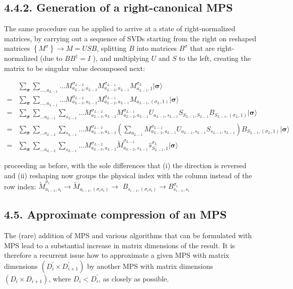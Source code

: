 \documentclass[12pt]{article}
\begin{document}
\subsection*{4.4.2. Generation of a right-canonical MPS}
The same procedure can be applied to arrive at a state of right-normalized matrices, by carrying out a sequence of SVDs starting from the right on reshaped matrices $\left\{M^{\sigma}\right\} \rightarrow M=U S B$, splitting $B$ into matrices $B^{\sigma}$ that are right-normalized (due to $B B^{\dagger}=I$ ), and multiplying $U$ and $S$ to the left, creating the matrix to be singular value decomposed next:


\begin{align*}
& \sum_{\boldsymbol{\sigma}} \sum_{\ldots, a_{L-1}} \ldots M_{a_{L-3}, a_{L-2}}^{\sigma_{L-2}} M_{a_{L-2}, a_{L-1}}^{\sigma_{L-1}} M_{a_{L-1}, 1}^{\sigma_{L}}|\boldsymbol{\sigma}\rangle \\
= & \sum_{\boldsymbol{\sigma}} \sum_{\ldots, a_{L-1}} \ldots M_{a_{L-3}, a_{L-2}}^{\sigma_{L-2}} M_{a_{L-2}, a_{L-1}}^{\sigma_{L-1}} M_{a_{L-1},\left(\sigma_{L}, 1\right)}|\boldsymbol{\sigma}\rangle \\
= & \sum_{\boldsymbol{\sigma}} \sum_{\ldots a_{L-1}} \sum_{s_{L-1}} \ldots M_{a_{L-3}, a_{L-2}}^{\sigma_{L-2}} M_{a_{L-2}, a_{L-1}}^{\sigma_{L-1}} U_{a_{L-1}, s_{L-1}} S_{S_{L-1}, S_{L-1}} B_{S_{L-1},\left(\sigma_{L}, 1\right)}|\boldsymbol{\sigma}\rangle \\
= & \sum_{\boldsymbol{\sigma}} \sum_{\ldots a_{L-2}} \sum_{s_{L-1}} \ldots M_{a_{L-3}, a_{L-2}}^{\sigma_{L-2}}\left(\sum_{a_{L-1}} M_{a_{L-2}, a_{L-1}}^{\sigma_{L-1}} U_{a_{L-1}, s_{L-1}} S_{s_{L-1}, s_{L-1}}\right) B_{S_{L-1},\left(\sigma_{L}, 1\right)}|\boldsymbol{\sigma}\rangle \\
= & \sum_{\boldsymbol{\sigma}} \sum_{\ldots a_{L-2}} \sum_{s_{L-1}} \ldots M_{a_{L-3}, a_{L-2}}^{\sigma_{L-2}} \tilde{M}_{a_{L-2}, s_{L-1}}^{\sigma_{L-1}} \hat{s}_{S_{L-1}, 1}^{\sigma_{L}}|\boldsymbol{\sigma}\rangle \tag{137}
\end{align*}


proceeding as before, with the sole differences that (i) the direction is reversed and (ii) reshaping now groups the physical index with the column instead of the row index: $\tilde{M}_{a_{i-1}, s_{i}}^{\sigma_{i}} \rightarrow \tilde{M}_{a_{i-1},\left(\sigma_{i} s_{i}\right)} \rightarrow$ $B_{s_{i-1},\left(\sigma_{i} s_{i}\right)} \rightarrow B_{s_{i-1}, s_{i}}^{\sigma_{i}}$

\subsection*{4.5. Approximate compression of an MPS}
The (rare) addition of MPS and various algorithms that can be formulated with MPS lead to a substantial increase in matrix dimensions of the result. It is therefore a recurrent issue how to approximate a given MPS with matrix dimensions $\left(D_{i}^{\prime} \times D_{i+1}^{\prime}\right)$ by another MPS with matrix dimensions $\left(D_{i} \times D_{i+1}\right)$, where $D_{i}<D_{i}^{\prime}$, as closely as possible.
\end{document}
